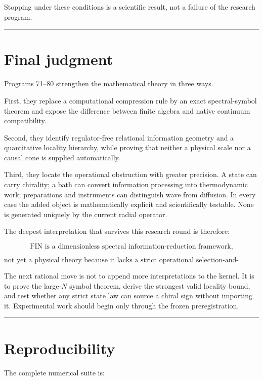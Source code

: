 \documentclass[11pt,a4paper,openany]{report}
\begin{document}
Stopping under these conditions is a scientific result, not a failure of the research program.

\par\medskip\hrule\medskip

\chapter{Final judgment}

Programs 71--80 strengthen the mathematical theory in three ways.

First, they replace a computational compression rule by an exact spectral-symbol theorem and expose the difference between finite algebra and native continuum compatibility.

Second, they identify regulator-free relational information geometry and a quantitative locality hierarchy, while proving that neither a physical scale nor a causal cone is supplied automatically.

Third, they locate the operational obstruction with greater precision. A state can carry chirality; a bath can convert information processing into thermodynamic work; preparations and instruments can distinguish wave from diffusion. In every case the added object is mathematically explicit and scientifically testable. None is generated uniquely by the current radial operator.

The deepest interpretation that survives this research round is therefore:

\[
\boxed{
\text{FIN is a dimensionless spectral information-reduction framework,}
}
\]

\[
\boxed{
\text{not yet a physical theory because it lacks a strict operational selection-and-calibration law.}
}
\]

The next rational move is not to append more interpretations to the kernel. It is to prove the large-\(N\) symbol theorem, derive the strongest valid locality bound, and test whether any strict state law can source a chiral sign without importing it. Experimental work should begin only through the frozen preregistration.

\par\medskip\hrule\medskip

\chapter{Reproducibility}

The complete numerical suite is:
\end{document}
